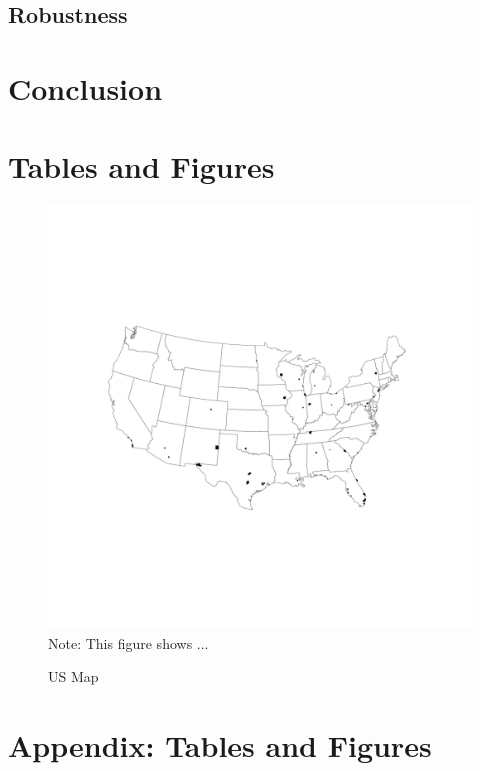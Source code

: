 \documentclass[12pt,a4paper,onecolumn]{article}
\begin{document}
\subsection{Robustness}
\section{Conclusion}






\pagebreak
\singlespacing

\pagebreak


\section*{Tables and Figures}


%

\pagebreak

\begin{figure}[H]
\caption{US Map} \label{fig:robust}
    \includegraphics[scale=0.75]{figures/fig1a.pdf}   
 \flushleft
 Note: This figure shows ...
\end{figure}

\pagebreak
\appendix
\renewcommand{\theequation}{\Alph{chapter}.\arabic{equation}}

\setcounter{figure}{0}
\setcounter{table}{0}
\makeatletter 
\renewcommand{\thefigure}{A.\@arabic\c@figure}
\renewcommand{\thetable}{A.\@arabic\c@table}

\section{Appendix: Tables and Figures}\label{sec:appendix_tables} 
\end{document}
